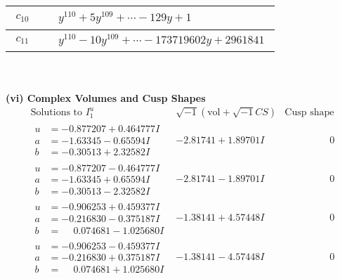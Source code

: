 \documentclass[1p]{elsarticle_modified}
\theoremstyle{definition}
\newcommand{\I}{\sqrt{-1}}
\begin{document}
\begin{tabular}{m{50pt}|m{274pt}}
\hline $$\begin{aligned}c_{10}\end{aligned}$$&$\begin{aligned}
&y^{110}+5 y^{109}+\cdots-129 y+1
\end{aligned}$\\
\hline $$\begin{aligned}c_{11}\end{aligned}$$&$\begin{aligned}
&y^{110}-10 y^{109}+\cdots-173719602 y+2961841
\end{aligned}$\\
\hline
\end{tabular}\\~\\
\newpage\flushleft \textbf{(vi) Complex Volumes and Cusp Shapes}
$$\begin{array}{c|c|c}  
\text{Solutions to }I^u_{1}& \I (\text{vol} + \sqrt{-1}CS) & \text{Cusp shape}\\
 \hline 
\begin{aligned}
u &= -0.877207 + 0.464777 I \\
a &= -1.63345 - 0.65594 I \\
b &= -0.30513 + 2.32582 I\end{aligned}
 & -2.81741 + 1.89701 I & \phantom{-0.000000 } 0 \\ \hline\begin{aligned}
u &= -0.877207 - 0.464777 I \\
a &= -1.63345 + 0.65594 I \\
b &= -0.30513 - 2.32582 I\end{aligned}
 & -2.81741 - 1.89701 I & \phantom{-0.000000 } 0 \\ \hline\begin{aligned}
u &= -0.906253 + 0.459377 I \\
a &= -0.216830 - 0.375187 I \\
b &= \phantom{-}0.074681 - 1.025680 I\end{aligned}
 & -1.38141 + 4.57448 I & \phantom{-0.000000 } 0 \\ \hline\begin{aligned}
u &= -0.906253 - 0.459377 I \\
a &= -0.216830 + 0.375187 I \\
b &= \phantom{-}0.074681 + 1.025680 I\end{aligned}
 & -1.38141 - 4.57448 I & \phantom{-0.000000 } 0 \\ \hline\begin{aligned}

\end{aligned}
\end{array}$$
\end{document}
